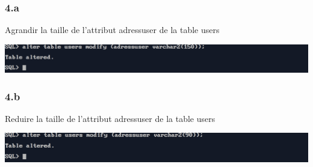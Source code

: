 \subsubsection*{4.a}
Agrandir la taille de l'attribut adressuser de la table users



\begin{center}
    \includegraphics[width=\textwidth]{ScreenShot/Partie2/big.png}
\end{center}

\vspace{0.25cm}
\subsubsection*{4.b}
Reduire la taille de l'attribut adressuser de la table users



\begin{center}
    \includegraphics[width=\textwidth]{ScreenShot/Partie2/small.png}
\end{center}
